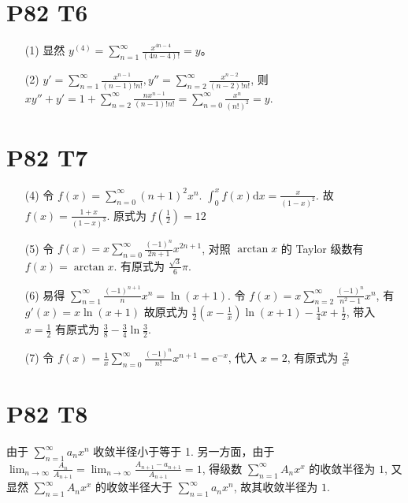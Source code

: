 \documentclass{article}
\begin{document}
\section*{P82 T6}

\begin{itemize}
    \item [(1)] 显然 $y^{(4)} = \sum_{n = 1}^{\infty}\frac{x^{4n - 4}}{(4n - 4)!} = y$。
    \item [(2)] $y' = \sum_{n = 1}^{\infty}\frac{x^{n - 1}}{(n - 1)!n!}, y'' =  \sum_{n = 2}^{\infty}\frac{x^{n - 2}}{(n - 2)!n!}$, 则 $xy'' + y' = 1 + \sum_{n = 2}^{\infty}\frac{nx^{n - 1}}{(n - 1)!n!} = \sum_{n = 0}^{\infty}\frac{x^n}{(n!)^2} = y$.
\end{itemize}

\section*{P82 T7}

\begin{itemize}
    \item [(4)] 令 $f(x) = \sum_{n = 0}^{\infty}(n + 1)^2 x^n$. $\int_{0}^{x}f(x)\mathrm{d}x = \frac{x}{(1 - x)^2}$. 故 $f(x) = \frac{1 + x}{(1 - x)^3}$. 原式为 $f(\frac{1}{2}) = 12$
    \item [(5)] 令 $f(x) = x\sum_{n = 0}^{\infty}\frac{(-1)^n}{2n + 1}x^{2n + 1}$, 对照 $\arctan x$ 的 Taylor 级数有 $f(x) = \arctan x$. 有原式为 $\frac{\sqrt{3}}{6}\pi$.
    \item [(6)] 易得 $\sum_{n = 1}^{\infty}\frac{(-1)^{n + 1}}{n}x^n = \ln (x + 1)$. 令 $f(x) = x\sum_{n = 2}^{\infty}\frac{(-1)^n}{n^2 - 1}x^n$, 有 $g'(x) = x\ln(x + 1)$ 故原式为 $\frac{1}{2}\left(x - \frac{1}{x}\right)\ln (x + 1) - \frac{1}{4}x + \frac{1}{2}$, 带入 $x = \frac{1}{2}$ 有原式为 $\frac{3}{8} - \frac{3}{4}\ln\frac{3}{2}$.
    \item [(7)] 令 $f(x) = \frac{1}{x}\sum_{n = 0}^{\infty}\frac{(-1)^n}{n!}x^{n + 1} = \mathrm{e}^{-x}$, 代入 $x = 2$, 有原式为 $\frac{2}{\mathrm{e}^2}$
\end{itemize}

\section*{P82 T8}

由于 $\sum_{n = 1}^{\infty}a_nx^n$ 收敛半径小于等于 1. 另一方面，由于 $\lim_{n \to \infty}\frac{A_n}{A_{n + 1}} = \lim_{n \to \infty}\frac{A_{n + 1} - a_{n + 1}}{A_{n + 1}} = 1$, 得级数 $\sum_{n = 1}^{\infty}A_nx^x$ 的收敛半径为 $1$, 又显然 $\sum_{n = 1}^{\infty}A_nx^x$ 的收敛半径大于 $\sum_{n = 1}^{\infty}a_nx^n$, 故其收敛半径为 $1$.
\end{document}
